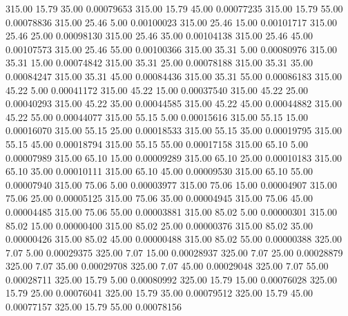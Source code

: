     315.00     15.79     35.00     0.00079653
    315.00     15.79     45.00     0.00077235
    315.00     15.79     55.00     0.00078836
    315.00     25.46      5.00     0.00100023
    315.00     25.46     15.00     0.00101717
    315.00     25.46     25.00     0.00098130
    315.00     25.46     35.00     0.00104138
    315.00     25.46     45.00     0.00107573
    315.00     25.46     55.00     0.00100366
    315.00     35.31      5.00     0.00080976
    315.00     35.31     15.00     0.00074842
    315.00     35.31     25.00     0.00078188
    315.00     35.31     35.00     0.00084247
    315.00     35.31     45.00     0.00084436
    315.00     35.31     55.00     0.00086183
    315.00     45.22      5.00     0.00041172
    315.00     45.22     15.00     0.00037540
    315.00     45.22     25.00     0.00040293
    315.00     45.22     35.00     0.00044585
    315.00     45.22     45.00     0.00044882
    315.00     45.22     55.00     0.00044077
    315.00     55.15      5.00     0.00015616
    315.00     55.15     15.00     0.00016070
    315.00     55.15     25.00     0.00018533
    315.00     55.15     35.00     0.00019795
    315.00     55.15     45.00     0.00018794
    315.00     55.15     55.00     0.00017158
    315.00     65.10      5.00     0.00007989
    315.00     65.10     15.00     0.00009289
    315.00     65.10     25.00     0.00010183
    315.00     65.10     35.00     0.00010111
    315.00     65.10     45.00     0.00009530
    315.00     65.10     55.00     0.00007940
    315.00     75.06      5.00     0.00003977
    315.00     75.06     15.00     0.00004907
    315.00     75.06     25.00     0.00005125
    315.00     75.06     35.00     0.00004945
    315.00     75.06     45.00     0.00004485
    315.00     75.06     55.00     0.00003881
    315.00     85.02      5.00     0.00000301
    315.00     85.02     15.00     0.00000400
    315.00     85.02     25.00     0.00000376
    315.00     85.02     35.00     0.00000426
    315.00     85.02     45.00     0.00000488
    315.00     85.02     55.00     0.00000388
    325.00      7.07      5.00     0.00029375
    325.00      7.07     15.00     0.00028937
    325.00      7.07     25.00     0.00028879
    325.00      7.07     35.00     0.00029708
    325.00      7.07     45.00     0.00029048
    325.00      7.07     55.00     0.00028711
    325.00     15.79      5.00     0.00080992
    325.00     15.79     15.00     0.00076028
    325.00     15.79     25.00     0.00076041
    325.00     15.79     35.00     0.00079512
    325.00     15.79     45.00     0.00077157
    325.00     15.79     55.00     0.00078156
